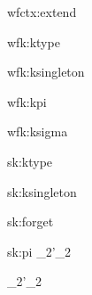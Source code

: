 \documentclass{article}
\theoremstyle{break}
\begin{document}
\infrule
  {}
  {\validcontext{\emptycontext}}

  {wfctx:extend}
  {\validkind{\context}{\kind}\qquad
     \cvar\not\in\BV{\context}}
  {\validcontext{\emptycontext,\sbindconstructor{\cvar}{\kind}}}



  {wfk:ktype}
  {\validcontext{\context}}
  {\validkind{\context}{\ktype}}

  {wfk:ksingleton}
  {\validconstructor{\context}{\constructor}{\ktype}}
  {\validkind{\context}{\ksingleton{\constructor}}}

  {wfk:kpi}
  {\qquad
   }
  {}

  {wfk:ksigma}
  {\qquad
   }
  {\validkind{\context}
     {}}


  {sk:ktype}
  {\validcontext{\context}}
  {\subkind{\context}{\ktype}{\ktype}}

  {sk:ksingleton}
  {}
  {
     {}}


  {sk:forget}
  {\validkind{\context}{\ksingleton{\constructor}}}
  {\subkind{\context}{\ksingleton{\constructor}}{\ktype}}

  {sk:pi}
  {\qquad
                {\kind_2}{\kind'_2}}
  {\subkind{\context}
      {}
      {}}

\infrule
  {\quad
        {\kind_2}{\kind'_2}}
  {\subkind{\context}
     {}
     {}}

   {\validconstructor{\context}{\constructor}{\kind}}

\infrule
  {\validcontext{\context}}
  {\validconstructor{\context}{\basetype}{\ktype}}
\end{document}
